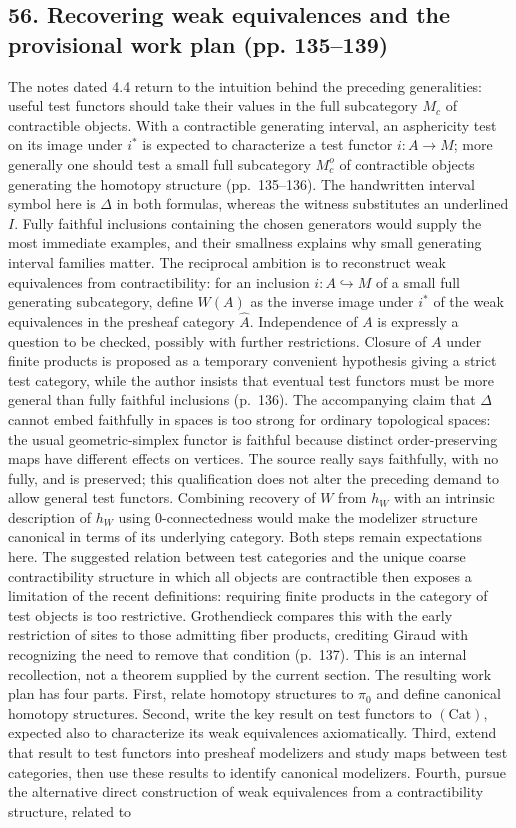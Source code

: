 \documentclass[10pt,oneside]{book}
\begin{document}
\subsection*{56. Recovering weak equivalences and the provisional work plan (pp. 135--139)}
The notes dated 4.4 return to the intuition behind the preceding generalities: useful test functors should take their values in the full subcategory $M_c$ of contractible objects. With a contractible generating interval, an asphericity test on its image under $i^*$ is expected to characterize a test functor $i:A\to M$; more generally one should test a small full subcategory $M_c^o$ of contractible objects generating the homotopy structure (pp.~135--136). The handwritten interval symbol here is $\Delta$ in both formulas, whereas the witness substitutes an underlined $I$. Fully faithful inclusions containing the chosen generators would supply the most immediate examples, and their smallness explains why small generating interval families matter. The reciprocal ambition is to reconstruct weak equivalences from contractibility: for an inclusion $i:A\hookrightarrow M$ of a small full generating subcategory, define $W(A)$ as the inverse image under $i^*$ of the weak equivalences in the presheaf category $\widehat A$. Independence of $A$ is expressly a question to be checked, possibly with further restrictions. Closure of $A$ under finite products is proposed as a temporary convenient hypothesis giving a strict test category, while the author insists that eventual test functors must be more general than fully faithful inclusions (p.~136). The accompanying claim that $\Delta$ cannot embed faithfully in spaces is too strong for ordinary topological spaces: the usual geometric-simplex functor is faithful because distinct order-preserving maps have different effects on vertices. The source really says faithfully, with no fully, and is preserved; this qualification does not alter the preceding demand to allow general test functors. Combining recovery of $W$ from $h_W$ with an intrinsic description of $h_W$ using $0$-connectedness would make the modelizer structure canonical in terms of its underlying category. Both steps remain expectations here. The suggested relation between test categories and the unique coarse contractibility structure in which all objects are contractible then exposes a limitation of the recent definitions: requiring finite products in the category of test objects is too restrictive. Grothendieck compares this with the early restriction of sites to those admitting fiber products, crediting Giraud with recognizing the need to remove that condition (p.~137). This is an internal recollection, not a theorem supplied by the current section. The resulting work plan has four parts. First, relate homotopy structures to $\pi_0$ and define canonical homotopy structures. Second, write the key result on test functors to $(\mathrm{Cat})$, expected also to characterize its weak equivalences axiomatically. Third, extend that result to test functors into presheaf modelizers and study maps between test categories, then use these results to identify canonical modelizers. Fourth, pursue the alternative direct construction of weak equivalences from a contractibility structure, related to 
\end{document}
